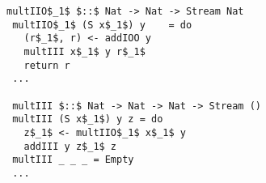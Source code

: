 \begin{figure}[h]
  \centering
  \begin{minipage}{\columnwidth}
    \begin{lstlisting}[frame=tb]
 multIIO$_1$ $::$ Nat -> Nat -> Stream Nat
 multIIO$_1$ (S x$_1$) y    = do
   (r$_1$, r) <- addIOO y
   multIII x$_1$ y r$_1$
   return r
 ...

 multIII $::$ Nat -> Nat -> Nat -> Stream ()
 multIII (S x$_1$) y z = do
   z$_1$ <- multIIO$_1$ x$_1$ y
   addIII y z$_1$ z
 multIII _ _ _ = Empty
 ...
    \end{lstlisting}
  \end{minipage}
\end{figure}
